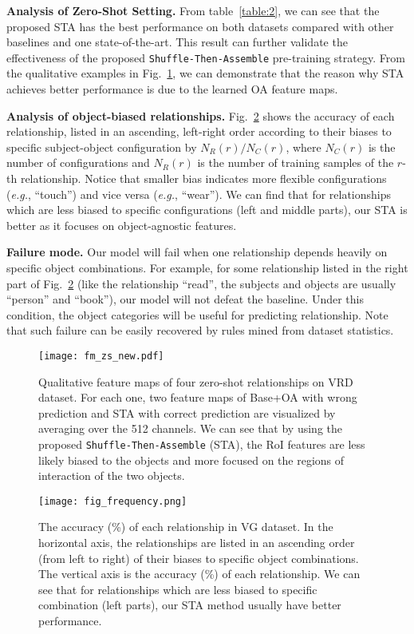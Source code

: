 \documentclass[runningheads]{llncs}
\begin{document}
\textbf{Analysis of Zero-Shot Setting.}
From table~\ref{table:2}, we can see that the proposed STA has the best performance on both datasets compared with other baselines and one state-of-the-art. This result can further validate the effectiveness of the proposed \texttt{Shuffle-Then-Assemble} pre-training strategy. From the qualitative examples in Fig.~\ref{fig:7}, we can demonstrate that the reason why STA achieves better performance is due to the learned OA feature maps.

\textbf{Analysis of object-biased relationships.}
Fig.~\ref{fig:8} shows the accuracy of each relationship, listed in an ascending, left-right order according to their biases to specific subject-object configuration by $N_R(r)/N_C(r)$, where $N_C(r)$ is the number of configurations and $N_R(r)$ is the number of training samples of the $r$-th relationship. Notice that smaller bias indicates more flexible configurations (\textit{e.g.}, ``touch'') and vice versa (\textit{e.g.}, ``wear''). We can find that for relationships which are less biased to specific configurations (left and middle parts), our STA is better as it focuses on object-agnostic features.

\textbf{Failure mode.}
Our model will fail when one relationship depends heavily on specific object combinations. For example, for some relationship listed in the right part of Fig.~\ref{fig:8} (like the relationship ``read'', the subjects and objects are usually ``person'' and ``book''), our model will not defeat the baseline. Under this condition, the object categories will be useful for predicting relationship. Note that such failure can be easily recovered by rules mined from dataset statistics.


\begin{figure}[t!]
\centering
\texttt{[image: fm\_zs\_new.pdf]}
\caption{Qualitative feature maps of four zero-shot relationships on VRD dataset. For each one, two feature maps of Base+OA with wrong prediction and STA with correct prediction are visualized by averaging over the 512 channels. We can see that by using the proposed \texttt{Shuffle-Then-Assemble} (STA), the RoI features are less likely biased to the objects and more focused on the regions of interaction of the two objects.
}
\label{fig:7}
\end{figure}

\begin{figure}[t!]
\centering
\texttt{[image: fig\_frequency.png]}
\caption{The accuracy (\%) of each relationship in VG dataset. In the horizontal axis, the relationships are listed in an ascending order (from left to right) of their biases to specific object combinations. The vertical axis is the accuracy (\%) of each relationship. We can see that for relationships which are less biased to specific combination (left parts), our STA method usually have better performance. 
}
\label{fig:8}
\end{figure}
\end{document}

